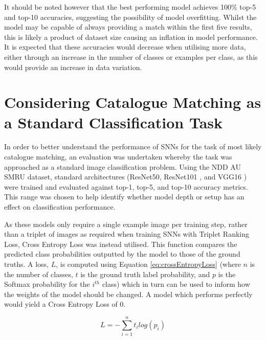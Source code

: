 It should be noted however that the best performing model achieves 100\% top-5 and top-10 accuracies, suggesting the possibility of model overfitting. Whilst the model may be capable of always providing a match within the first five results, this is likely a product of dataset size causing an inflation in model performance. It is expected that these accuracies would decrease when utilising more data, either through an increase in the number of classes or examples per class, as this would provide an increase in data variation.

\section{Considering Catalogue Matching as a Standard Classification Task}\label{ch:SNNEvaluation,sec:comparsion}

In order to better understand the performance of SNNs for the task of most likely catalogue matching, an evaluation was undertaken whereby the task was approached as a standard image classification problem. Using the NDD AU SMRU dataset, standard architectures (ResNet50, ResNet101 \cite{he_deep_2015}, and VGG16 \cite{simonyan_very_2015}) were trained and evaluated against top-1, top-5, and top-10 accuracy metrics. This range was chosen to help identify whether model depth or setup has an effect on classification performance. 

As these models only require a single example image per training step, rather than a triplet of images as required when training SNNs with Triplet Ranking Loss, Cross Entropy Loss was instead utilised. This function compares the predicted class probabilities outputted by the model to those of the ground truths. A loss, $L$, is computed using Equation \ref{eq:crossEntropyLoss} (where $n$ is the number of classes, $t$ is the ground truth label probability, and $p$ is the Softmax probability for the $i^{th}$ class) which in turn can be used to inform how the weights of the model should be changed. A model which performs perfectly would yield a Cross Entropy Loss of 0. 

\begin{equation}
	\label{eq:crossEntropyLoss}
	L = -\sum_{i=1}^{n} t_{i} log(p_{i})
\end{equation}

